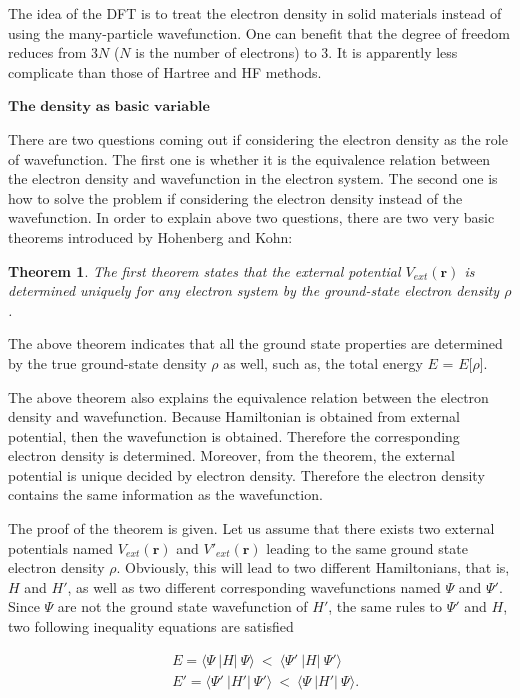 \documentclass[a4paper, 12pt, titlepage,oneside,drop]{kthesis}
\newtheorem{thm}{Theorem}
\begin{document}
The idea of the DFT is to treat the electron density in solid materials instead of using the many-particle wavefunction. One can benefit that the degree of freedom reduces from 3$N$ ($N$ is the number of electrons) to 3. It is apparently less 
complicate than those of Hartree and HF methods. 

$\textbf{The density as basic variable}$ 

There are two questions coming out if considering the electron density as the role of wavefunction. The first one is whether it is the equivalence relation between the electron density and wavefunction in the electron system. 
The second one is how to solve the problem if considering the electron density instead of the wavefunction. In order to explain above two questions, there are two very basic theorems introduced by Hohenberg and Kohn:

\begin{thm}
\label{hk1}
\noindent The first theorem states that the external potential $V_{ext}(\textbf{r})$  is determined uniquely for any electron system by the ground-state electron density $\rho$.
\end{thm}

The above theorem indicates that all the ground state properties are determined by the true ground-state density $\rho$ as well,
such as, the total energy $E$ = $E$[$\rho$]. 

The above theorem also explains the equivalence relation between the electron density and wavefunction. Because Hamiltonian is obtained from external potential,
then the wavefunction is obtained. Therefore the corresponding electron density is determined. Moreover, from the theorem, the external potential is unique decided by electron
density. Therefore the electron density contains the same information as the wavefunction.

The proof of the theorem is given. Let us assume that there exists two external potentials named $V_{ext}(\textbf{r})$ and $V'_{ext}(\textbf{r})$ leading to the same ground state 
electron density $\rho$. Obviously, this will lead to two different Hamiltonians, that is, ${H}$ and ${H'}$, as well as two different corresponding
wavefunctions named $\Psi$ and $\Psi'$. Since $\Psi$ are not the ground state wavefunction of ${H'}$, the same rules to $\Psi'$ and ${H}$, two following
inequality equations are satisfied

\begin{equation}\label{hkpf1}\begin{split}
&  E = \langle \Psi\ |{H}|\ \Psi \rangle  \ < \  \langle \Psi'\ |{H}|\ \Psi' \rangle \\
&  E' = \langle \Psi'\ |{H'}|\ \Psi' \rangle  \ < \  \langle \Psi\ |{H'}|\ \Psi \rangle.
\end{split}\end{equation}
\end{document}
